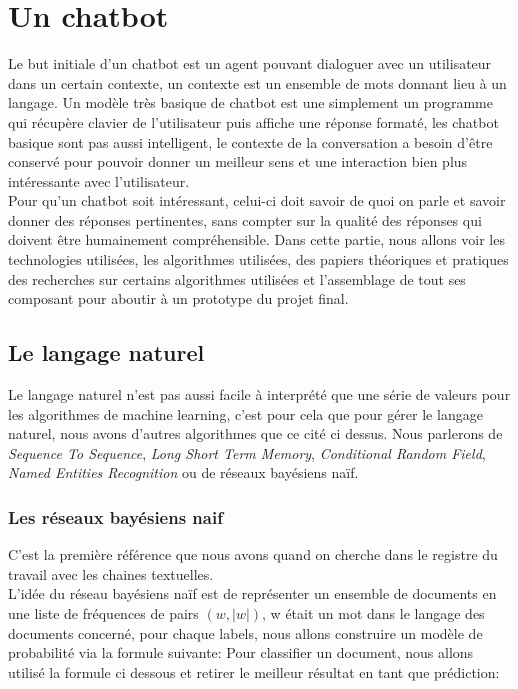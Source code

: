 
\part{Un chatbot}

Le but initiale d'un chatbot est un agent pouvant dialoguer avec un utilisateur dans un certain contexte, un contexte est un ensemble de mots donnant lieu à un langage.\linebreak
Un modèle très basique de chatbot est une simplement un programme qui récupère clavier de l'utilisateur puis affiche une réponse formaté, les chatbot basique sont pas aussi intelligent, le contexte de la conversation a besoin d'être conservé pour pouvoir donner un meilleur sens et une interaction bien plus intéressante avec l'utilisateur.\linebreak
\\
Pour qu'un chatbot soit intéressant, celui-ci doit savoir de quoi on parle et savoir donner des réponses pertinentes, sans compter sur la qualité des réponses qui doivent être humainement compréhensible.\linebreak
\linebreak
Dans cette partie, nous allons voir les technologies utilisées, les algorithmes utilisées, des papiers théoriques et pratiques des recherches sur certains algorithmes utilisées et l'assemblage de tout ses composant pour aboutir à un prototype du projet final.

\chapter{Le langage naturel}

Le langage naturel n'est pas aussi facile à interprété que une série de valeurs pour les algorithmes de machine learning, c'est pour cela que pour gérer le langage naturel, nous avons d'autres algorithmes que ce cité ci dessus.
Nous parlerons de \textit{Sequence To Sequence}, \textit{Long Short Term Memory},  \textit{Conditional Random Field}, \textit{Named Entities Recognition} ou de réseaux bayésiens naïf.\\

\pagebreak
\section{Les réseaux bayésiens naif}

C'est la première référence que nous avons quand on cherche dans le registre du travail avec les chaines textuelles.\\
L'idée du réseau bayésiens naïf est de représenter un ensemble de documents en une liste de fréquences de pairs $(w, |w|)$, w était un mot dans le langage des documents concerné, pour chaque labels, nous allons construire un modèle de probabilité via la formule suivante:
Pour classifier un document, nous allons utilisé la formule ci dessous et retirer le meilleur résultat en tant que prédiction:


